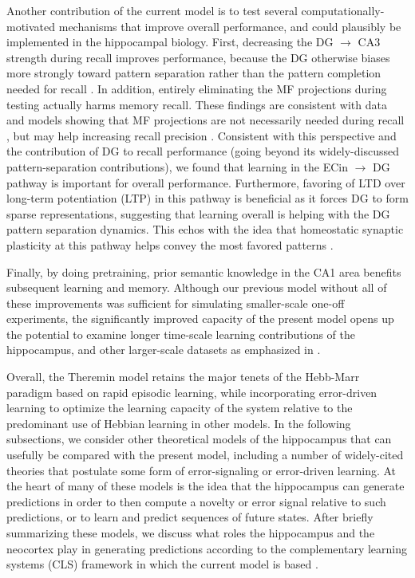 \documentclass[10pt,letterpaper]{article}
\begin{document}
Another contribution of the current model is to test several computationally-motivated mechanisms that improve overall performance, and could plausibly be implemented in the hippocampal biology. First, decreasing the DG $\rightarrow$ CA3 strength during recall improves performance, because the DG otherwise biases more strongly toward pattern separation rather than the pattern completion needed for recall \cite{OReillyMcClelland94,KunecHasselmoKopell05}. In addition, entirely eliminating the MF projections during testing actually harms memory recall.  These findings are consistent with data and models showing that MF projections are not necessarily needed during recall \cite{NakashibaCushmanPelkeyEtAl12,BernierLacagninaAyoubEtAl17,Rolls13}, but may help increasing recall precision \cite{RuedigerVittoriBednarekEtAl11,NakashibaCushmanPelkeyEtAl12,BernierLacagninaAyoubEtAl17,PignatelliRyanRoyEtAl19}.  Consistent with this perspective and the contribution of DG to recall performance (going beyond its widely-discussed pattern-separation contributions), we found that learning in the ECin $\rightarrow$ DG pathway is important for overall performance.  Furthermore, favoring of LTD over long-term potentiation (LTP) in this pathway is beneficial as it forces DG to form sparse representations, suggesting that learning overall is helping with the DG pattern separation dynamics.  This echos with the idea that homeostatic synaptic plasticity at this pathway helps convey the most favored patterns \cite{Hsu07}.

Finally, by doing pretraining, prior semantic knowledge in the CA1 area benefits subsequent learning and memory.  Although our previous model without all of these improvements was sufficient for simulating smaller-scale one-off experiments, the significantly improved capacity of the present model opens up the potential to examine longer time-scale learning contributions of the hippocampus, and other larger-scale datasets as emphasized in \cite{KowadloAhmedRawlinson20}.

Overall, the Theremin model retains the major tenets of the Hebb-Marr paradigm based on rapid episodic learning, while incorporating error-driven learning to optimize the learning capacity of the system relative to the predominant use of Hebbian learning in other models.  In the following subsections, we consider other theoretical models of the hippocampus that can usefully be compared with the present model, including a number of widely-cited theories that postulate some form of error-signaling or error-driven learning.  At the heart of many of these models is the idea that the hippocampus can generate predictions in order to then compute a novelty or error signal relative to such predictions, or to learn and predict sequences of future states. After briefly summarizing these models, we discuss what roles the hippocampus and the neocortex play in generating predictions according to the complementary learning systems (CLS) framework in which the current model is based \cite{McClellandMcNaughtonOReilly95,OReillyBhattacharyyaHowardEtAl14,OReillyRanganathRussin21}.  
\end{document}
